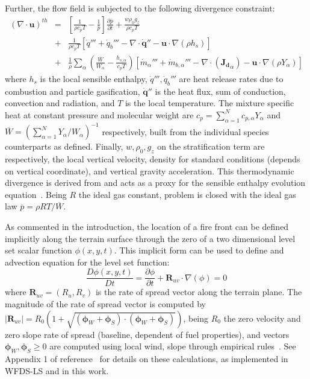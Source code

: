 \documentclass[journal,article,atmosphere,submit,moreauthors,pdftex]{Definitions/mdpi}
\begin{document}
Further, the flow field is subjected to the following divergence constraint:
%
\begin{eqnarray}
    ( \nabla \cdot \mathbf{u} )^{th} &=&
    \left[ \frac{1}{\rho c_p T} - \frac{1}{\bar{p}} \right]
    \frac{\partial \bar{p}}{\partial t} + \frac{w \rho_0 g_z}{\rho c_p T} \nonumber \\
    &+& \frac{1}{\rho c_p T} \left[ \dot{q}''' + \dot{q}_b''' - \nabla \cdot \dot{\mathbf{q}}'' - \mathbf{u} \cdot \nabla (\rho h_s) \right] \nonumber \\
    &+& \frac{1}{\rho} \sum_\alpha \left( \frac{\overline{W}}{W_\alpha} - \frac{h_{s,\alpha}}{c_p T} \right) \left[ \dot{m}_\alpha'''  + \dot{m}_{b,\alpha}''' - \nabla \cdot (\mathbf{J_{d}}_\alpha) - \mathbf{u} \cdot \nabla (\rho Y_\alpha) \right] \label{eq:divth}
\end{eqnarray}
%
where $h_s$ is the local sensible enthalpy, $\dot{q}''', \dot{q}_b'''$ are heat release rates due to combustion and particle gasification, $\dot{\mathbf{q}}''$ is the heat flux, sum of conduction, convection and radiation, and $T$ is the local temperature. The mixture specific heat at constant pressure and molecular weight are $c_p=\sum_{\alpha =1}^N{c_{p,\alpha} Y_\alpha}$ and $\overline{W}=\left(\sum_{\alpha =1}^N{Y_\alpha /W_\alpha} \right)^{-1}$ respectively, built from the individual species counterparts as defined. Finally, $w,\rho_0,g_z$ on the stratification term are respectively, the local vertical velocity, density for standard conditions (depends on vertical coordinate), and vertical gravity acceleration. This thermodynamic divergence is derived from and acts as a proxy for the sensible enthalpy evolution equation~\cite{mcdermo_2014}. Being $R$ the ideal gas constant, problem is closed with the ideal gas law $ \overline{p} = {\rho R T}/{\overline{W}}$.

As commented in the introduction, the location of a fire front can be defined implicitly along the terrain surface through the zero of a two dimensional level set scalar function $\phi(x,y,t)$. This implicit form can be used to define and advection equation for the level set function:
%
\begin{equation}
   \frac{D \phi(x,y,t)}{D t} =  \frac{\partial \phi}{\partial t} + \mathbf{R}_{uv} \cdot \nabla (\phi) = 0 \label{eqn:lset}
\end{equation}
%
where $\mathbf{R}_{uv}=(R_u,R_v)$ is the rate of spread vector along the terrain plane. The magnitude of the rate of spread vector is computed by $|\mathbf{R}_{uv}|=R_0 \left(1 + \sqrt{(\boldsymbol{\phi}_W+\boldsymbol{\phi}_S) \cdot (\boldsymbol{\phi}_W+\boldsymbol{\phi}_S) } \right)$, being $R_0$ the zero velocity and zero slope rate of spread (baseline, dependent of fuel properties), and vectors $\boldsymbol{\phi}_W,\boldsymbol{\phi}_S \ge 0$ are computed using local wind, slope through empirical rules~\cite{Wilson:1980}. See Appendix 1 of reference~\cite{Bova:IJWF2015} for details on these calculations, as implemented in WFDS-LS and in this work.
\end{document}
